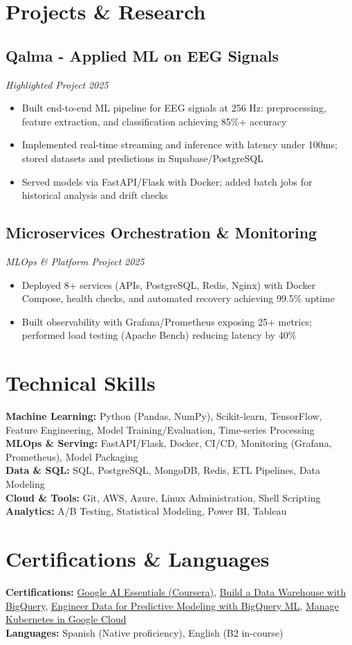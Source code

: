 \documentclass[7.5pt,a4paper]{article}
\newcommand{\project}[3]{\subsection*{#1}\textit{#2} \hfill \textit{#3}}
\begin{document}
\section*{Projects \& Research}

\project{Qalma - Applied ML on EEG Signals}{Highlighted Project}{2025}
\begin{itemize}
\item Built end-to-end ML pipeline for EEG signals at 256 Hz: preprocessing, feature extraction, and classification achieving 85\%+ accuracy
\item Implemented real-time streaming and inference with latency under 100ms; stored datasets and predictions in Supabase/PostgreSQL
\item Served models via FastAPI/Flask with Docker; added batch jobs for historical analysis and drift checks
\end{itemize}

\project{Microservices Orchestration \& Monitoring}{MLOps \& Platform Project}{2025}
\begin{itemize}
\item Deployed 8+ services (APIs, PostgreSQL, Redis, Nginx) with Docker Compose, health checks, and automated recovery achieving 99.5\% uptime
\item Built observability with Grafana/Prometheus exposing 25+ metrics; performed load testing (Apache Bench) reducing latency by 40\%
\end{itemize}

\section*{Technical Skills}
\textbf{Machine Learning:} Python (Pandas, NumPy), Scikit-learn, TensorFlow, Feature Engineering, Model Training/Evaluation, Time-series Processing \\
\textbf{MLOps \& Serving:} FastAPI/Flask, Docker, CI/CD, Monitoring (Grafana, Prometheus), Model Packaging \\
\textbf{Data \& SQL:} SQL, PostgreSQL, MongoDB, Redis, ETL Pipelines, Data Modeling \\
\textbf{Cloud \& Tools:} Git, AWS, Azure, Linux Administration, Shell Scripting \\
\textbf{Analytics:} A/B Testing, Statistical Modeling, Power BI, Tableau

\section*{Certifications \& Languages}
\textbf{Certifications:} \href{https://www.credly.com/badges/1e3dfdbc-ec96-4e7c-a6e6-351eefae2390/public_url}{Google AI Essentials (Coursera)}, \href{https://www.credly.com/badges/c41430a1-de6e-4642-86e2-0d55dad94f18/public_url}{Build a Data Warehouse with BigQuery}, \href{https://www.credly.com/badges/18b87ad4-da02-4a37-a92e-f8e60fa53559/public_url}{Engineer Data for Predictive Modeling with BigQuery ML}, \href{https://www.credly.com/badges/5e7db262-4e11-41d3-8630-2b8c9c3458e3/public_url}{Manage Kubernetes in Google Cloud} \\
\textbf{Languages:} Spanish (Native proficiency), English (B2 in-course)
\end{document}
